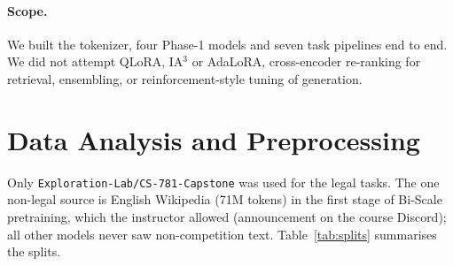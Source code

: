 \documentclass[11pt]{article}
\begin{document}
\paragraph{Scope.} We built the tokenizer, four Phase-1 models and seven task pipelines end to end. We did not attempt QLoRA, IA$^3$ or AdaLoRA, cross-encoder re-ranking for retrieval, ensembling, or reinforcement-style tuning of generation.

\section{Data Analysis and Preprocessing}
\label{sec:data}
Only \texttt{Exploration-Lab/CS-781-Capstone} was used for the legal tasks. The one non-legal source is English Wikipedia \cite{wikipedia} (71M tokens) in the first stage of Bi-Scale pretraining, which the instructor allowed (announcement on the course Discord); all other models never saw non-competition text. Table~\ref{tab:splits} summarises the splits.

\begin{table}[H]
\centering\small
\caption{Splits and length statistics (tokens counted with our 32k BPE tokenizer).}
\label{tab:splits}
\end{table}
\end{document}
